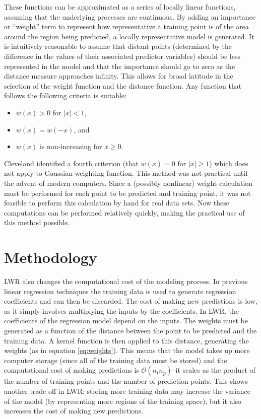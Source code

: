 \documentclass{IEEEtran}
\begin{document}
These functions can be approximated as a series of locally linear functions, assuming that the underlying processes are continuous. By adding an importance or ``weight'' term to represent how representative a training point is of the area around the region being predicted, a locally representative model is generated. It is intuitively reasonable to assume that distant points (determined by the difference in the values of their associated predictor variables) should be less represented in the model and that the importance should go to zero as the distance measure approaches infinity. This allows for broad latitude in the selection of the weight function and the distance function. Any function that follows the following criteria \cite{cleveland1979robust} is suitable:

\begin{itemize}
\item $w(x) > 0$ for $|x| < 1$,
\item $w(x) = w(-x)$, and
\item $w(x)$ is non-increasing for $x \geq 0$.
\end{itemize}

Cleveland identified a fourth criterion (that $w(x) = 0$ for $|x| \geq 1$) which does not apply to Gaussian weighting function. This method was not practical until the advent of modern computers. Since a (possibly nonlinear) weight calculation must be performed for each point to be predicted and training point, it was not feasible to perform this calculation by hand for real data sets. Now these computations can be performed relatively quickly, making the practical use of this method possible. 

\section{Methodology}

LWR also changes the computational cost of the modeling process. In previous linear regression techniques the training data is used to generate regression coefficients and can then be discarded. The cost of making new predictions is low, as it simply involves multiplying the inputs by the coefficients. In LWR, the coefficients of the regression model depend on the inputs. The weights must be generated as a function of the distance between the point to be predicted and the training data. A kernel function is then applied to this distance, generating the weights (as in equation \ref{eq:weights}). This means that the model takes up more computer storage (since all of the training data must be stored) and the computational cost of making predictions is $\mathcal{O}(n_t n_p)$--it scales as the product of the number of training points and the number of prediction points. This shows another trade off in LWR: storing more training data may increase the variance of the model (by representing more regions of the training space), but it also increases the cost of making new predictions. 
\end{document}
